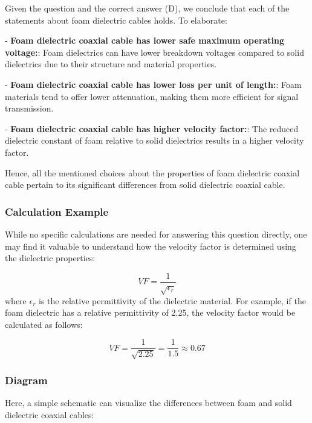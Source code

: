 Given the question and the correct answer (D), we conclude that each of the statements about foam dielectric cables holds. To elaborate:

- \textbf{Foam dielectric coaxial cable has lower safe maximum operating voltage:}: Foam dielectrics can have lower breakdown voltages compared to solid dielectrics due to their structure and material properties.
  
- \textbf{Foam dielectric coaxial cable has lower loss per unit of length:}: Foam materials tend to offer lower attenuation, making them more efficient for signal transmission.

- \textbf{Foam dielectric coaxial cable has higher velocity factor:}: The reduced dielectric constant of foam relative to solid dielectrics results in a higher velocity factor.

Hence, all the mentioned choices about the properties of foam dielectric coaxial cable pertain to its significant differences from solid dielectric coaxial cable.

\subsubsection{Calculation Example}

While no specific calculations are needed for answering this question directly, one may find it valuable to understand how the velocity factor is determined using the dielectric properties:

\[
VF = \frac{1}{\sqrt{\epsilon_r}}
\]
where \(\epsilon_r\) is the relative permittivity of the dielectric material. For example, if the foam dielectric has a relative permittivity of 2.25, the velocity factor would be calculated as follows:

\[
VF = \frac{1}{\sqrt{2.25}} = \frac{1}{1.5} \approx 0.67
\]

\subsubsection{Diagram}

Here, a simple schematic can visualize the differences between foam and solid dielectric coaxial cables:

